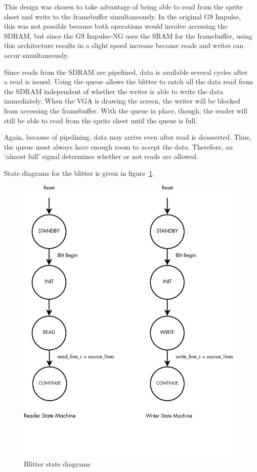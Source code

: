 \documentclass{report}
\begin{document}
This design was chosen to take advantage of being able to
read from the sprite sheet and write to the framebuffer simultaneously.
In the original G9 Impulse, this was not possible because both
operations would involve accessing the SDRAM, but since the G9
Impulse-NG uses the SRAM for the framebuffer, using this architecture
results in a slight speed increase because reads and writes can occur
simultaneously.

Since reads from the SDRAM are pipelined, data is available several
cycles after a read is issued. Using the queue allows the blitter to
catch all the data read from the SDRAM independent of whether the writer
is able to write the data immediately. When the VGA is drawing the
screen, the writer will be blocked from accessing the framebuffer. With the
queue in place, though, the reader will still be able to read from the
sprite sheet until the queue is full.

Again, because of pipelining, data may arrive even after read is
deasserted. Thus, the queue must always have enough room to accept the
data. Therefore, an `almost full' signal determines whether or not reads
are allowed.

State diagrams for the blitter is given in
figure~\ref{fig:blitter_state}.

\begin{figure}[htb!]
    \begin{center}
        \includegraphics[width=4.5in,trim=0 1.5in 0 0,clip=true]{blitter_state}
    \end{center}
    \caption{Blitter state diagrams}
    \label{fig:blitter_state}
\end{figure}
\end{document}
